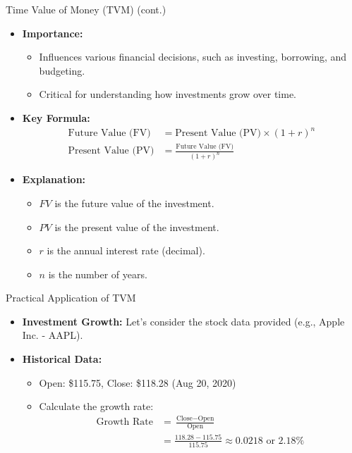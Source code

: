 \documentclass{beamer}
\begin{document}
\begin{frame}{Time Value of Money (TVM) (cont.)}
    \begin{itemize}
        \item \textbf{Importance:}
        \begin{itemize}
            \item Influences various financial decisions, such as investing, borrowing, and budgeting.
            \item Critical for understanding how investments grow over time.
        \end{itemize}
        \item \textbf{Key Formula:}
        \begin{align*}
            \text{Future Value (FV)} &= \text{Present Value (PV)} \times (1 + r)^n \\
            \text{Present Value (PV)} &= \frac{\text{Future Value (FV)}}{(1 + r)^n}
        \end{align*}
        \item \textbf{Explanation:}
        \begin{itemize}
            \item \( FV \) is the future value of the investment.
            \item \( PV \) is the present value of the investment.
            \item \( r \) is the annual interest rate (decimal).
            \item \( n \) is the number of years.
        \end{itemize}
    \end{itemize}
\end{frame}

\begin{frame}{Practical Application of TVM}
    \begin{itemize}
        \item \textbf{Investment Growth:} Let's consider the stock data provided (e.g., Apple Inc. - AAPL).
        \item \textbf{Historical Data:}
        \begin{itemize}
            \item Open: \$115.75, Close: \$118.28 (Aug 20, 2020)
            \item Calculate the growth rate: 
            \begin{align*}
                \text{Growth Rate} &= \frac{\text{Close} - \text{Open}}{\text{Open}} \\
                &= \frac{118.28 - 115.75}{115.75} \approx 0.0218 \text{ or } 2.18\%
            \end{align*}
        \end{itemize}
    \end{itemize}
\end{frame}
\end{document}
